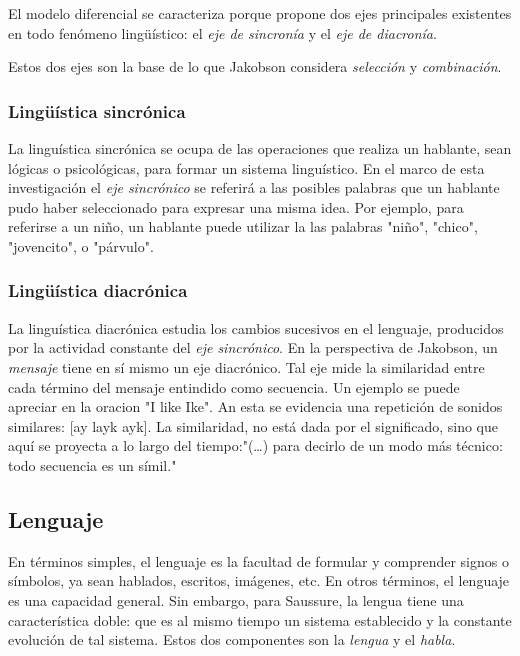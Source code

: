 \documentclass[12pt,letterpaper,twoside]{article}
\begin{document}
El modelo diferencial se caracteriza porque propone dos ejes
principales existentes en todo fenómeno lingüístico: el \emph{eje de
sincronía} y el \emph{eje de diacronía}.

Estos dos ejes son la base de lo que Jakobson considera \emph{selección} y
\emph{combinación}.


\subsubsection{Lingüística sincrónica}
\label{sec:org087217a}

La linguística sincrónica se ocupa de las
operaciones que realiza un hablante, sean lógicas o psicológicas,
para formar un sistema linguístico. En el
marco de esta investigación el \emph{eje sincrónico} se referirá a las
posibles palabras que un hablante pudo haber seleccionado para
expresar una misma idea. Por ejemplo, para referirse a un
niño, un hablante puede utilizar la las palabras "niño", "chico",
"jovencito", o "párvulo".


\subsubsection{Lingüística diacrónica}
\label{sec:orgaa8ed62}

La linguística diacrónica estudia los cambios sucesivos en el
lenguaje, producidos por la actividad constante del \emph{eje
sincrónico}. En la perspectiva de Jakobson, un \emph{mensaje} tiene en
sí mismo un eje diacrónico. Tal eje mide la similaridad entre cada
término del mensaje entindido como secuencia. Un ejemplo se puede
apreciar en la oracion "I like Ike". An esta se evidencia una
repetición de sonidos similares: [ay layk ayk]. La similaridad, no
está dada por el significado, sino que aquí se proyecta a lo largo
del tiempo:"(\ldots{}) para decirlo de un modo más técnico: todo
secuencia es un símil."

\subsection{Lenguaje}
\label{sec:orgfa82ca7}
En términos simples, el lenguaje es la facultad de formular y
comprender signos o símbolos, ya sean hablados, escritos,
imágenes, etc.  En otros términos, el lenguaje es una capacidad
general. Sin embargo, para Saussure, la lengua tiene una
característica doble: que es al mismo tiempo un sistema
establecido y la constante evolución de tal sistema. Estos dos
componentes son la \emph{lengua} y el \emph{habla}.
\end{document}
